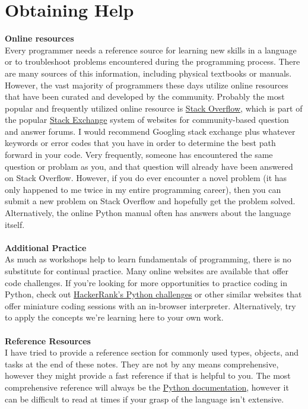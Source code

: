 \documentclass[a4paper,11pt]{article}
\begin{document}
\section{Obtaining Help}
\textbf{Online resources} \\
Every programmer needs a reference source for learning new skills in a language or to troubleshoot 
problems encountered during the programming process.  There are many sources of this information, 
including physical textbooks or manuals.  However, the vast majority of programmers these days utilize 
online resources that have been curated and developed by the community.  Probably the most popular and 
frequently utilized online resource is \href{https://stackoverflow.com}{Stack Overflow}, which is part 
of the popular \href{https://stackexchange.com/}{Stack Exchange} system of websites for community-based 
question and answer forums.  I would recommend Googling stack exchange plus whatever keywords or error 
codes that you have in order to determine the best path forward in your code.  Very frequently, someone 
has encountered the same question or problam as you, and that question will already have been answered 
on Stack Overflow.  However, if you do ever encounter a novel problem (it has only happened to me twice 
in my entire programming career), then you can submit a new problem on Stack Overflow and hopefully get 
the problem solved.  Alternatively, the online Python manual often has answers about the language itself. \\
\\
\textbf{Additional Practice} \\
As much as workshops help to learn fundamentals of programming, there is no substitute for continual 
practice.  Many online websites are available that offer code challenges.  If you're looking for 
more opportunities to practice coding in Python, check out 
\href{https://www.hackerrank.com/domains/python}{HackerRank's Python challenges} or other similar 
websites that offer miniature coding sessions with an in-browser interpreter.  Alternatively, 
try to apply the concepts we're learning here to your own work. \\
\\
\textbf{Reference Resources} \\
I have tried to provide a reference section for commonly used types, objects, and tasks at the end of 
these notes.  They are not by any means comprehensive, however they might provide a fast reference if 
that is helpful to you.  The most comprehensive reference will always be the 
\href{https://docs.python.org/3/}{Python documentation}, 
however it can be difficult to read at times if your grasp of the language isn't extensive.
\end{document}
